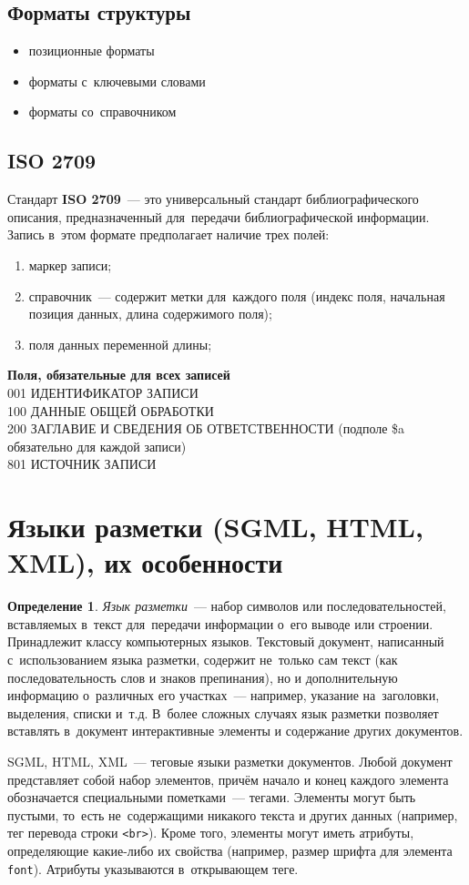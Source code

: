 \documentclass[12pt]{article}
\theoremstyle{definition}
\newtheorem*{defn}{Определение}
\theoremstyle{remark}
\numberwithin{equation}{section}
\begin{document}
\subsection{Форматы структуры}
\begin{itemize}
    \item позиционные форматы
    \item форматы с~ключевыми словами
    \item форматы со~справочником
\end{itemize}

\subsection{ISO 2709}
\label{subsec:ISO}
Стандарт \textbf{ISO 2709}~--- это универсальный стандарт
библиографического описания, предназначенный для~передачи
библиографической информации. Запись в~этом формате предполагает
наличие трех полей:
\begin{enumerate}
    \item маркер записи;
    \item справочник~--- содержит метки для~каждого поля
    (индекс поля, начальная позиция данных, длина содержимого поля);
    \item поля данных переменной длины;
\end{enumerate}

\textbf{Поля, обязательные для всех записей}
\\
001 ИДЕНТИФИКАТОР ЗАПИСИ \\
100 ДАННЫЕ ОБЩЕЙ ОБРАБОТКИ \\
200 ЗАГЛАВИЕ И СВЕДЕНИЯ ОБ ОТВЕТСТВЕННОСТИ (подполе \$a обязательно для каждой записи) \\
801 ИСТОЧНИК ЗАПИСИ \\

\section{Языки разметки (SGML, HTML, XML), их особенности}
\begin{defn}
{\sl Язык разметки}~--- набор символов или последовательностей,
вставляемых в~текст для~передачи информации о~его выводе или строении.
Принадлежит классу компьютерных языков. Текстовый документ, написанный
с~использованием языка разметки, содержит не~только сам текст (как
последовательность слов и знаков препинания), но и дополнительную
информацию о~различных его участках~--- например, указание на~заголовки,
выделения, списки и~т.д. В~более сложных случаях язык разметки
позволяет вставлять в~документ интерактивные элементы и содержание
других документов.
\end{defn}
SGML, HTML, XML~--- теговые языки разметки документов. Любой документ
представляет собой набор элементов, причём начало и конец каждого
элемента обозначается специальными пометками~--- тегами. Элементы
могут быть пустыми, то~есть не~содержащими никакого текста и других
данных (например, тег перевода строки \texttt{<br>}). Кроме того,
элементы могут иметь атрибуты, определяющие какие\nobreakdash-либо
их свойства (например, размер шрифта для элемента \texttt{font}).
Атрибуты указываются в~открывающем теге.
\end{document}

